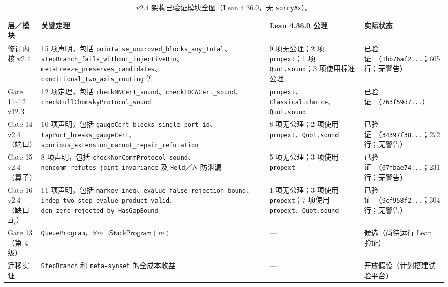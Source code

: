 \documentclass[11pt,a4paper,UTF8,fontset=fandol]{ctexart}
\DeclareRobustCommand{\id}[1]{\nolinkurl{#1}}
\begin{document}
\begin{table}[htbp]
\centering\small
\begin{tabularx}{\linewidth}{@{}p{23mm}Xp{34mm}p{32mm}@{}}
\toprule
层／模块 & 关键定理 & Lean 4.36.0 公理 & 实际状态 \\
\midrule
修订内核 v2.4 & 15 项声明，包括 \id{pointwise_unproved_blocks_any_total}、\id{stepBranch_fails_without_injectiveBin}、\id{metaFreeze_preserves_candidates}、\id{conditional_two_axis_routing} 等 &
9 项无公理；2 项 \id{propext}；1 项 \id{Quot.sound}；3 项使用标准公理 &
已验证~\cite{kernel}（\id{1bb76af2...}；605 行；无警告）\\
Gate 11–12 v12.3 & 12 项定理，包括 \id{checkMNCert_sound}、\id{check1DCACert_sound}、\id{checkFullChomskyProtocol_sound} &
\id{propext}、\id{Classical.choice}、\id{Quot.sound} &
已验证~\cite{g1112}（\id{763f59d7...}）\\
Gate 14 v2.4（端口） & 10 项声明，包括 \id{gaugeCert_blocks_single_port_id}、\id{tapPort_breaks_gaugeCert}、\id{spurious_extension_cannot_repair_refutation} &
8 项无公理；2 项使用 \id{propext}、\id{Quot.sound} &
已验证~\cite{g14}（\id{34397f38...}；272 行；无警告）\\
Gate 15 v2.4（算子） & 8 项声明，包括 \id{checkNonCommProtocol_sound}、\id{noncomm_refutes_joint_invariance} 及 \id{Held}／$N$ 防泄漏 &
5 项无公理；3 项使用 \id{propext} &
已验证~\cite{g15}（\id{67fbae74...}；231 行；无警告）\\
Gate 16 v2.4（缺口 $\Delta_\varepsilon$） & 11 项声明，包括 \id{markov_ineq}、\id{evalue_false_rejection_bound}、\id{indep_two_step_evalue_product_valid}、\id{den_zero_rejected_by_HasGapBound} &
1 项无公理；3 项使用 \id{propext}；7 项使用 \id{propext}、\id{Quot.sound} &
已验证~\cite{g16}（\id{9cf958f2...}；304 行；无警告）\\
Gate 13（第 4 级） & \id{QueueProgram}，$\forall m\,\neg\mathsf{StackProgram}(m)$ & — & 候选（尚待运行 Lean 验证）\\
迁移实证 & \id{StepBranch} 和 \id{meta-synset} 的全成本收益 & — & 开放假设（计划搭建试验平台）\\
\bottomrule
\end{tabularx}
\caption{v2.4 架构已验证模块全图（Lean 4.36.0，无 \id{sorryAx}）。}
\label{tab:verify}
\end{table}
\end{document}
